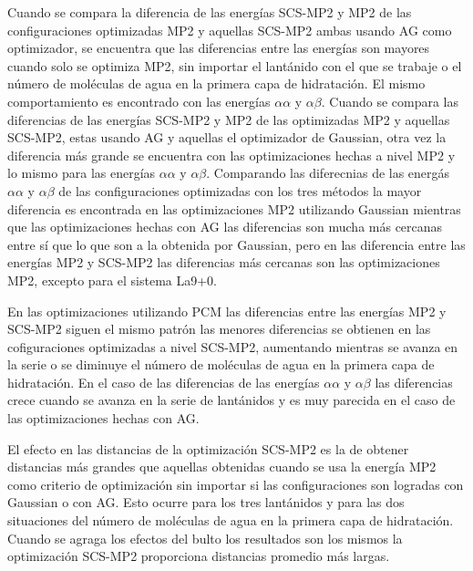 Cuando se compara la diferencia de las energ\'ias SCS-MP2 y MP2 de
las configuraciones optimizadas MP2 y aquellas SCS-MP2 ambas usando
AG como optimizador, se encuentra que las diferencias entre las 
energ\'ias son mayores cuando solo se optimiza MP2, sin importar el
lant\'anido con el que se trabaje o el n\'umero de mol\'eculas de 
agua en la primera capa de hidrataci\'on. El mismo comportamiento es 
encontrado con las energ\'ias $\alpha\alpha$ y $\alpha\beta$. Cuando
se compara las diferencias de las energ\'ias SCS-MP2 y MP2 de las 
optimizadas MP2 y aquellas SCS-MP2, estas usando AG y aquellas el 
optimizador de Gaussian, otra vez la diferencia m\'as grande se 
encuentra con las optimizaciones hechas a nivel MP2 y lo mismo para
las energ\'ias $\alpha\alpha$ y $\alpha\beta$. Comparando las 
diferecnias de las energ\'as $\alpha\alpha$ y $\alpha\beta$ de las
configuraciones optimizadas con los tres m\'etodos la mayor 
diferencia es encontrada en las optimizaciones MP2 utilizando 
Gaussian mientras que las optimizaciones hechas con AG las 
diferencias son mucha m\'as cercanas entre s\'i que lo que son a la
obtenida por Gaussian, pero en las diferencia entre las energ\'ias
MP2 y SCS-MP2 las diferencias m\'as cercanas son las optimizaciones
MP2, excepto para el sistema La9+0.

En las optimizaciones utilizando PCM las diferencias entre las 
energ\'ias MP2 y SCS-MP2 siguen el mismo patr\'on las menores 
diferencias se obtienen en las cofiguraciones optimizadas a nivel 
SCS-MP2, aumentando mientras se avanza en la serie o se diminuye el
n\'umero de mol\'eculas de agua en la primera capa de hidrataci\'on.
En el caso de las diferencias de las energ\'ias $\alpha\alpha$ y
$\alpha\beta$ las diferencias crece cuando se avanza en la serie de
lant\'anidos y es muy parecida en el caso de las optimizaciones 
hechas con AG. %

El efecto en las distancias de la optimizaci\'on SCS-MP2 es la de 
obtener distancias m\'as grandes que aquellas obtenidas cuando se usa
la energ\'ia MP2 como criterio de optimizaci\'on sin importar si las
configuraciones son logradas con Gaussian o con AG. Esto ocurre para
los tres lant\'anidos y para las dos situaciones del n\'umero de
mol\'eculas de agua en la primera capa de hidrataci\'on. Cuando se
agraga los efectos del bulto los resultados son los mismos la 
optimizaci\'on SCS-MP2 proporciona distancias promedio m\'as largas.
